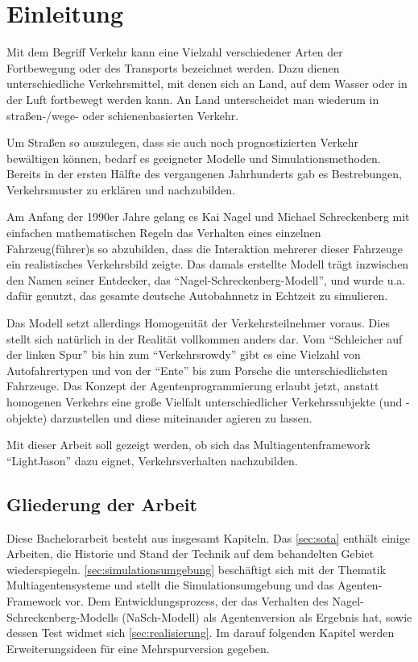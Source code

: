 \section{Einleitung}
\label{sec:einleitung}

Mit dem Begriff Verkehr kann eine Vielzahl verschiedener Arten der Fortbewegung oder des Transports bezeichnet werden. 
Dazu dienen unterschiedliche Verkehrsmittel, mit denen sich an Land, auf dem Wasser oder in der Luft fortbewegt werden kann.
An Land unterscheidet man wiederum in \mbox{straßen-/}wege- oder schienenbasierten Verkehr.

Um Straßen so auszulegen, dass sie auch noch prognostizierten Verkehr bewältigen können, bedarf es geeigneter Modelle und Simulationsmethoden.
Bereits in der ersten Hälfte des  vergangenen Jahrhunderts gab es Bestrebungen, Verkehrsmuster zu erklären und nachzubilden.

Am Anfang der 1990er Jahre gelang es Kai Nagel und Michael Schreckenberg mit einfachen mathematischen Regeln das Verhalten eines einzelnen Fahrzeug(führer)s so abzubilden, dass die Interaktion mehrerer dieser Fahrzeuge ein realistisches Verkehrsbild zeigte.
Das damals erstellte Modell trägt inzwischen den Namen seiner Entdecker, das \enquote{Nagel-Schreckenberg-Modell}, und wurde u.a. dafür genutzt, das gesamte deutsche Autobahnnetz in Echtzeit zu simulieren.

Das Modell setzt allerdings Homogenität der Verkehrsteilnehmer voraus. 
Dies stellt sich natürlich in der Realität vollkommen anders dar.
Vom \enquote{Schleicher auf der linken Spur} bis hin zum \enquote{Verkehrsrowdy} gibt es eine Vielzahl von Autofahrertypen und von der \enquote{Ente} bis zum Porsche die unterschiedlichsten Fahrzeuge.
Das Konzept der Agentenprogrammierung erlaubt jetzt, anstatt homogenen Verkehrs eine große Vielfalt unterschiedlicher Verkehrssubjekte (und -objekte) darzustellen und diese miteinander agieren zu lassen.

Mit dieser Arbeit soll gezeigt werden, ob sich das Multiagentenframework \enquote{LightJason} dazu eignet, Verkehrsverhalten nachzubilden.



\subsection{Gliederung der Arbeit}
\label{sec:gliederung}

Diese Bachelorarbeit besteht aus insgesamt  Kapiteln.
Das \cref{sec:sota} enthält einige Arbeiten, die Historie und Stand der Technik auf dem behandelten Gebiet wiederspiegeln.
\cref{sec:simulationsumgebung} beschäftigt sich mit der Thematik Multiagentensysteme und stellt die Simulationsumgebung und das Agenten-Framework vor.
Dem Entwicklungsprozess, der das Verhalten des Nagel-Schreckenberg-Modells (NaSch-Modell) als Agentenversion als Ergebnis hat, sowie dessen Test widmet sich \cref{sec:realisierung}.
Im darauf folgenden Kapitel werden Erweiterungsideen für eine Mehrspurversion gegeben.

